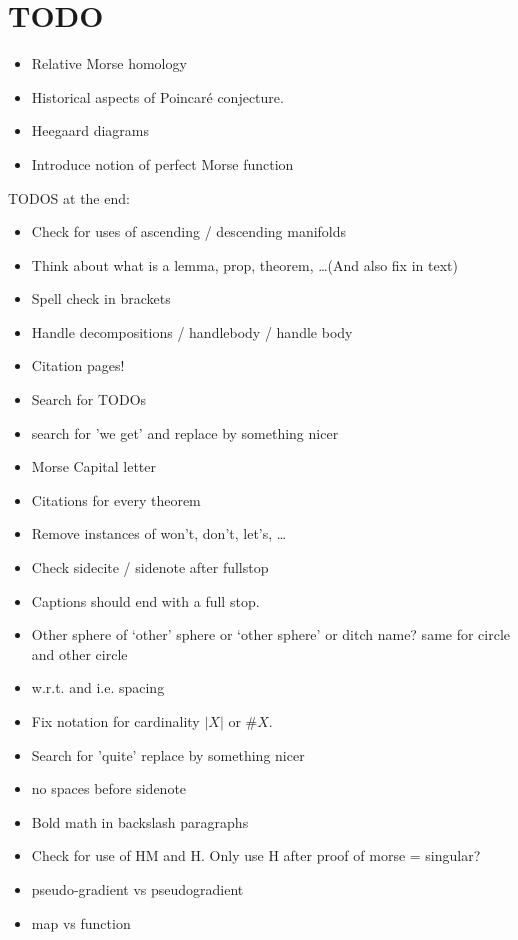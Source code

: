 \chapter*{TODO}
\begin{itemize}
    \item Relative Morse homology
    \item Historical aspects of Poincaré conjecture.
    \item Heegaard diagrams
    \item Introduce notion of perfect Morse function
\end{itemize}


TODOS at the end:
\begin{itemize}
    \item Check for uses of ascending / descending manifolds
    \item Think about what is a lemma, prop, theorem, \ldots (And also fix in text)
    \item Spell check in brackets
    \item Handle decompositions / handlebody / handle body
    \item Citation pages!
    \item Search for TODOs
    \item search for 'we get' and replace by something nicer
    \item Morse Capital letter
    \item Citations for every theorem
    \item Remove instances of won't, don't, let's, \ldots
    \item Check sidecite / sidenote after fullstop
    \item Captions should end with a full stop.
    \item Other sphere of `other' sphere or `other sphere' or ditch name? same for circle and other circle
    \item w.r.t. and i.e. spacing
        \item Fix notation for cardinality $|X| $ or  $\# X$.
        \item Search for 'quite' replace by something nicer
        \item no spaces before sidenote
        \item Bold math in backslash paragraphs
        \item Check for use of HM and H. Only use H after proof of morse = singular?
        \item pseudo-gradient vs pseudogradient
        \item map vs function

\end{itemize}
